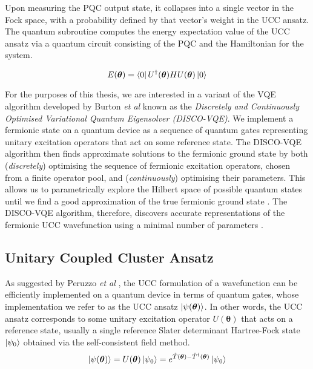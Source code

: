 Upon measuring the PQC output state, it collapses into a single vector in the Fock space, with a probability defined by that vector's weight in the UCC ansatz. The quantum subroutine computes the energy expectation value of the UCC ansatz via a quantum circuit consisting of the PQC and the Hamiltonian for the system.

\begin{equation*}
    E(\bm\theta) = \bra{0} U^\dagger(\bm\theta) H U(\bm\theta) \ket{0} 
\end{equation*}

For the purposes of this thesis, we are interested in a variant of the VQE algorithm developed by Burton \textit{et al} \cite{Burton2023} known as the \textit{Discretely and Continuously Optimised Variational Quantum Eigensolver (DISCO-VQE)}. We implement a fermionic state on a quantum device as a sequence of quantum gates representing unitary excitation operators that act on some reference state. The DISCO-VQE algorithm then finds approximate solutions to the fermionic ground state by both (\textit{discretely}) optimising the sequence of fermionic excitation operators, chosen from a finite operator pool, and (\textit{continuously}) optimising their parameters. This allows us to parametrically explore the Hilbert space of possible quantum states until we find a good approximation of the true fermionic ground state \cite{Taube2006}. The DISCO-VQE algorithm, therefore, discovers accurate representations of the fermionic UCC wavefunction using a minimal number of parameters \cite{Burton2023}.


\subsection{Unitary Coupled Cluster Ansatz}%
\label{unitary-coupled-cluster-ansatz}

As suggested by Peruzzo \textit{et al} \cite{Peruzzo2014}, the UCC formulation of a wavefunction can be efficiently implemented on a quantum device in terms of quantum gates, whose implementation we refer to as the UCC ansatz $\ket{\psi(\bm\theta)}$. In other words, the UCC ansatz corresponds to some unitary excitation operator $U(\bm\theta)$ that acts on a reference state, usually a single reference Slater determinant Hartree-Fock state $\ket{\psi_0}$ obtained via the self-consistent field method.
\begin{equation*}
    \ket{\psi(\bm\theta)} = U(\bm\theta) \ket{\psi_0} =
    e^{\hat T(\bm\theta) - \hat T^\dagger(\bm\theta)} \ket{\psi_0}
\end{equation*}

